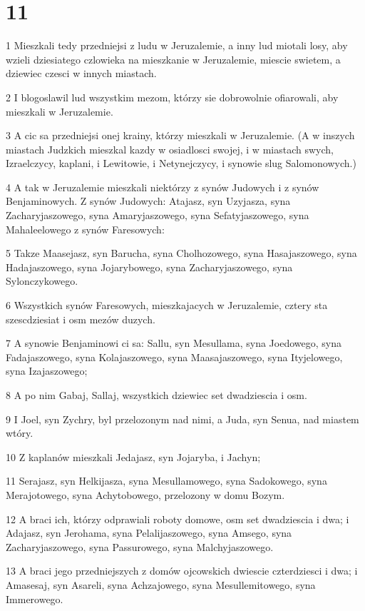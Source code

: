 \chapter{11}

\par 1 Mieszkali tedy przedniejsi z ludu w Jeruzalemie, a inny lud miotali losy, aby wzieli dziesiatego czlowieka na mieszkanie w Jeruzalemie, miescie swietem, a dziewiec czesci w innych miastach.
\par 2 I blogoslawil lud wszystkim mezom, którzy sie dobrowolnie ofiarowali, aby mieszkali w Jeruzalemie.
\par 3 A cic sa przedniejsi onej krainy, którzy mieszkali w Jeruzalemie. (A w inszych miastach Judzkich mieszkal kazdy w osiadlosci swojej, i w miastach swych, Izraelczycy, kaplani, i Lewitowie, i Netynejczycy, i synowie slug Salomonowych.)
\par 4 A tak w Jeruzalemie mieszkali niektórzy z synów Judowych i z synów Benjaminowych. Z synów Judowych: Atajasz, syn Uzyjasza, syna Zacharyjaszowego, syna Amaryjaszowego, syna Sefatyjaszowego, syna Mahaleelowego z synów Faresowych:
\par 5 Takze Maasejasz, syn Barucha, syna Cholhozowego, syna Hasajaszowego, syna Hadajaszowego, syna Jojarybowego, syna Zacharyjaszowego, syna Sylonczykowego.
\par 6 Wszystkich synów Faresowych, mieszkajacych w Jeruzalemie, cztery sta szescdziesiat i osm mezów duzych.
\par 7 A synowie Benjaminowi ci sa: Sallu, syn Mesullama, syna Joedowego, syna Fadajaszowego, syna Kolajaszowego, syna Maasajaszowego, syna Ityjelowego, syna Izajaszowego;
\par 8 A po nim Gabaj, Sallaj, wszystkich dziewiec set dwadziescia i osm.
\par 9 I Joel, syn Zychry, byl przelozonym nad nimi, a Juda, syn Senua, nad miastem wtóry.
\par 10 Z kaplanów mieszkali Jedajasz, syn Jojaryba, i Jachyn;
\par 11 Serajasz, syn Helkijasza, syna Mesullamowego, syna Sadokowego, syna Merajotowego, syna Achytobowego, przelozony w domu Bozym.
\par 12 A braci ich, którzy odprawiali roboty domowe, osm set dwadziescia i dwa; i Adajasz, syn Jerohama, syna Pelalijaszowego, syna Amsego, syna Zacharyjaszowego, syna Passurowego, syna Malchyjaszowego.
\par 13 A braci jego przedniejszych z domów ojcowskich dwiescie czterdziesci i dwa; i Amasesaj, syn Asareli, syna Achzajowego, syna Mesullemitowego, syna Immerowego.
